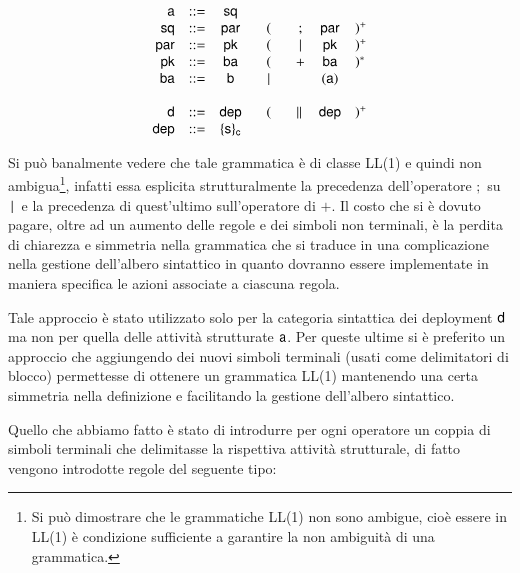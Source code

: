$$
\begin{array}{rcccccl}
{\sf a} 	& ::= & {\sf sq}	& 	&&&\\
{\sf sq} 	& ::= & {\sf par} & (&  ; 	& {\sf par} & )^+ \\
{\sf par} & ::= & {\sf pk} 	& (& \,|\, & {\sf pk}  & )^+ \\
{\sf pk} 	& ::= & {\sf ba}  & (& + 	& {\sf ba}  & )^* \\
{\sf ba}  & ::= & {\sf b} 	& \!\quad | \quad\! & &( {\sf a} ) \\
\\ 
{\sf d} 	& ::= & {\sf dep} & (& \|\, & {\sf dep}  & )^+ \\
{\sf dep} & ::= & \{ {\sf s} \}_{{\sf c}} 	& & & \\
\end{array}
$$ 

Si può banalmente vedere che tale grammatica è di classe LL(1) e quindi non
ambigua\footnote{Si può dimostrare che le grammatiche LL(1) non sono ambigue,
cioè essere in LL(1) è condizione sufficiente a garantire la non ambiguità di
una grammatica.}, infatti essa esplicita strutturalmente la precedenza
dell'operatore $;$ su $\,|\,$ e la precedenza di quest'ultimo sull'operatore di
$+$. Il costo che si è dovuto pagare, oltre ad un aumento delle regole e dei
simboli non terminali, è la perdita di chiarezza e simmetria nella
grammatica che si traduce in una complicazione nella gestione
dell'albero sintattico in quanto dovranno essere implementate in maniera
specifica le azioni associate a ciascuna regola.

Tale approccio è stato utilizzato solo per la categoria sintattica dei
deployment ${\sf d}$ ma non per quella delle attività strutturate ${\sf a}$. Per
queste ultime si è preferito un approccio che aggiungendo dei nuovi simboli
terminali (usati come delimitatori di blocco) permettesse di ottenere un
grammatica LL(1) mantenendo una certa simmetria nella definizione e facilitando
la gestione dell'albero sintattico.

Quello che abbiamo fatto è stato di introdurre per ogni operatore un coppia di
simboli terminali che delimitasse la rispettiva attività
strutturale, di fatto vengono introdotte regole del seguente tipo:

